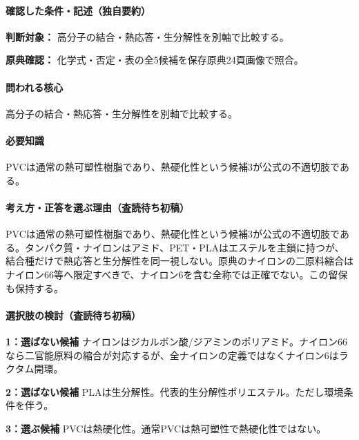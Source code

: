 \paragraph{確認した条件・記述（独自要約）}\mbox{}\par

\noindent\textbf{判断対象：} 高分子の結合・熱応答・生分解性を別軸で比較する。\par

\noindent\textbf{原典確認：} 化学式・否定・表の全5候補を保存原典24頁画像で照合。\par

\paragraph{問われる核心} 高分子の結合・熱応答・生分解性を別軸で比較する。

\paragraph{必要知識} PVCは通常の熱可塑性樹脂であり、熱硬化性という候補3が公式の不適切肢である。

\paragraph{考え方・正答を選ぶ理由（査読待ち初稿）} PVCは通常の熱可塑性樹脂であり、熱硬化性という候補3が公式の不適切肢である。タンパク質・ナイロンはアミド、PET・PLAはエステルを主鎖に持つが、結合種だけで熱応答と生分解性を同一視しない。原典のナイロンの二原料縮合はナイロン66等へ限定すべきで、ナイロン6を含む全称では正確でない。この留保も保持する。

\paragraph{選択肢の検討（査読待ち初稿）}\mbox{}\par

\noindent\textbf{1：選ばない候補} ナイロンはジカルボン酸/ジアミンのポリアミド。ナイロン66なら二官能原料の縮合が対応するが、全ナイロンの定義ではなくナイロン6はラクタム開環。\par

\noindent\textbf{2：選ばない候補} PLAは生分解性。代表的生分解性ポリエステル。ただし環境条件を伴う。\par

\noindent\textbf{3：選ぶ候補} PVCは熱硬化性。通常PVCは熱可塑性で熱硬化性ではない。\par

